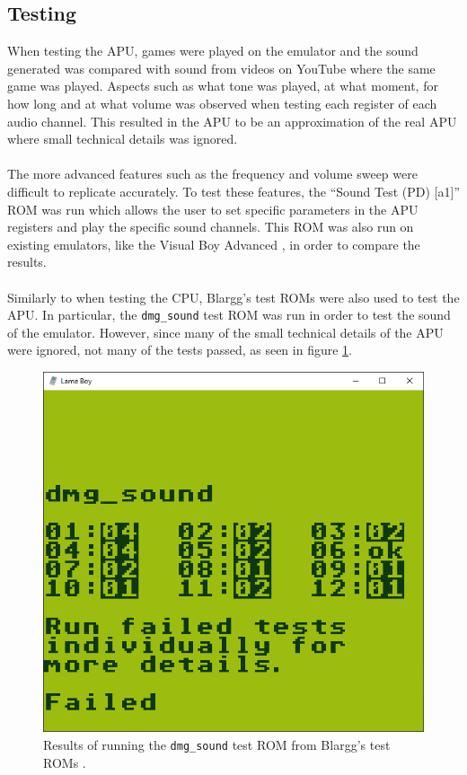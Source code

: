 \subsection{Testing}
When testing the APU, games were played on the emulator and the sound generated was compared with sound from videos on YouTube where the same game was played. Aspects such as what tone was played, at what moment, for how long and at what volume was observed when testing each register of each audio channel. This resulted in the APU to be an approximation of the real APU where small technical details was ignored.
\\\\
The more advanced features such as the frequency and volume sweep were difficult to replicate accurately. To test these features, the ``Sound Test (PD) [a1]'' \cite{SountTestPD} ROM was run which allows the user to set specific parameters in the APU registers and play the specific sound channels. This ROM was also run on existing emulators, like the Visual Boy Advanced \cite{visualBoyAdvanced}, in order to compare the results.
\\\\
Similarly to when testing the CPU, Blargg's test ROMs \cite{Blargg} were also used to test the APU. In particular, the \texttt{dmg\_sound} test ROM was run in order to test the sound of the emulator. However, since many of the small technical details of the APU were ignored, not many of the tests passed, as seen in figure \ref{fig:blargg_dmg_sound}.

\begin{figure}[H]
    \centering
    \includegraphics[width=\textwidth/2]{figures/APU/blargg_dmg_sound.PNG}
    \caption{Results of running the \texttt{dmg\_sound} test ROM from Blargg's test ROMs \cite{Blargg}.}
    \label{fig:blargg_dmg_sound}
\end{figure}

